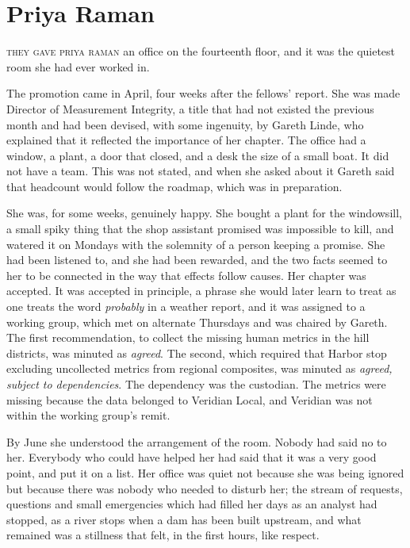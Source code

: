\part{Priya Raman}


\textsc{they gave priya raman} an office on the fourteenth floor, and it was the quietest room she had ever worked in.

The promotion came in April, four weeks after the fellows' report. She was made Director of Measurement Integrity, a title that had not existed the previous month and had been devised, with some ingenuity, by Gareth Linde, who explained that it reflected the importance of her chapter. The office had a window, a plant, a door that closed, and a desk the size of a small boat. It did not have a team. This was not stated, and when she asked about it Gareth said that headcount would follow the roadmap, which was in preparation.

She was, for some weeks, genuinely happy. She bought a plant for the windowsill, a small spiky thing that the shop assistant promised was impossible to kill, and watered it on Mondays with the solemnity of a person keeping a promise. She had been listened to, and she had been rewarded, and the two facts seemed to her to be connected in the way that effects follow causes. Her chapter was accepted. It was accepted in principle, a phrase she would later learn to treat as one treats the word \emph{probably} in a weather report, and it was assigned to a working group, which met on alternate Thursdays and was chaired by Gareth. The first recommendation, to collect the missing human metrics in the hill districts, was minuted as \emph{agreed}. The second, which required that Harbor stop excluding uncollected metrics from regional composites, was minuted as \emph{agreed, subject to dependencies}. The dependency was the custodian. The metrics were missing because the data belonged to Veridian Local, and Veridian was not within the working group's remit.

By June she understood the arrangement of the room. Nobody had said no to her. Everybody who could have helped her had said that it was a very good point, and put it on a list. Her office was quiet not because she was being ignored but because there was nobody who needed to disturb her; the stream of requests, questions and small emergencies which had filled her days as an analyst had stopped, as a river stops when a dam has been built upstream, and what remained was a stillness that felt, in the first hours, like respect.

